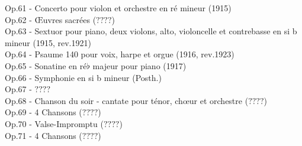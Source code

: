 Op.61 - Concerto pour violon et orchestre en ré mineur (1915)\\
Op.62 - Œuvres sacrées ($????$)\\
Op.63 - Sextuor pour piano, deux violons, alto, violoncelle et contrebasse en si b mineur (1915, rev.1921)\\
Op.64 - Psaume 140 pour voix, harpe et orgue (1916, rev.1923)\\
Op.65 - Sonatine en ré$\flat$ majeur pour piano (1917)\\
Op.66 - Symphonie  en si b mineur (Posth.)\\
Op.67 - $????$\\
Op.68 - Chanson du soir - cantate pour ténor, chœur et orchestre ($????$)\\
Op.69 - 4 Chansons ($????$)\\
Op.70 - Valse-Impromptu  ($????$)\\
Op.71 - 4 Chansons ($????$)
